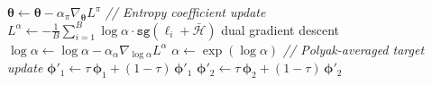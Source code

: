 \documentclass[11pt]{article}
\begin{document}
\begin{algorithm}[p]
\begin{minipage}[t]{0.68\linewidth}
\begin{algorithmic}[1]
            \State $\boldsymbol{\theta} \gets \boldsymbol{\theta} - \alpha_\pi \nabla_{\boldsymbol{\theta}} L^\pi$
            \Statex \hspace{\algorithmicindent}\hspace{\algorithmicindent}\hspace{\algorithmicindent}\hspace{\algorithmicindent}\textit{// Entropy coefficient update}
            \State $L^\alpha \gets -\frac{1}{B}\sum_{i=1}^B \log\alpha \cdot \texttt{sg}(\ell_i + \bar{\mathcal{H}})$ \hfill dual gradient descent
            \State $\log\alpha \gets \log\alpha - \alpha_\alpha \nabla_{\log\alpha} L^\alpha$
            \State $\alpha \gets \exp(\log\alpha)$
        \EndIf
        \Statex \hspace{\algorithmicindent}\hspace{\algorithmicindent}\hspace{\algorithmicindent}\textit{// Polyak-averaged target update}
        \State $\boldsymbol{\phi}'_1 \gets \tau\,\boldsymbol{\phi}_1 + (1 - \tau)\,\boldsymbol{\phi}'_1$
        \State $\boldsymbol{\phi}'_2 \gets \tau\,\boldsymbol{\phi}_2 + (1 - \tau)\,\boldsymbol{\phi}'_2$
    \EndFor
\EndFor
\end{algorithmic}
\end{minipage}
\end{algorithm}

\end{document}
